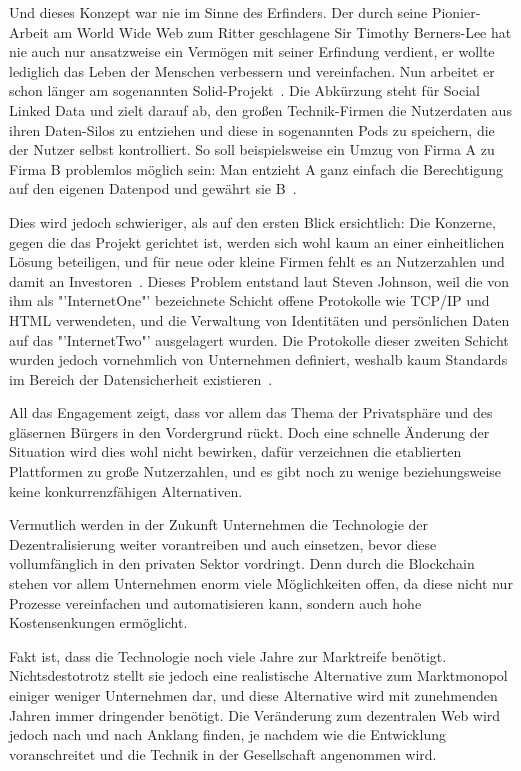 Und dieses Konzept war nie im Sinne des Erfinders. Der durch seine Pionier-Arbeit am World Wide Web zum Ritter geschlagene Sir Timothy Berners-Lee hat nie auch nur ansatzweise ein Vermögen mit seiner Erfindung verdient, er wollte lediglich das Leben der Menschen verbessern und vereinfachen. 
Nun arbeitet er schon länger am sogenannten Solid-Projekt~\cite{Clark.2018}. 
Die Abkürzung steht für Social Linked Data und zielt darauf ab, den großen Technik-Firmen die Nutzerdaten aus ihren Daten-Silos zu entziehen und diese in sogenannten Pods zu speichern, die der Nutzer selbst kontrolliert. 
So soll beispielsweise ein Umzug von Firma A zu Firma B problemlos möglich sein: Man entzieht A ganz einfach die Berechtigung auf den eigenen Datenpod und gewährt sie B~\cite{Park.2018}. 

\smallskip

Dies wird jedoch schwieriger, als auf den ersten Blick ersichtlich: Die Konzerne, gegen die das Projekt gerichtet ist, werden sich wohl kaum an einer einheitlichen Lösung beteiligen, und für neue oder kleine Firmen fehlt es an Nutzerzahlen und damit an Investoren~\cite{Park.2018}. Dieses Problem entstand laut Steven Johnson, weil die von ihm als "'InternetOne"' bezeichnete Schicht offene Protokolle wie TCP/IP und HTML verwendeten, und die Verwaltung von Identitäten und persönlichen Daten auf das "'InternetTwo"' ausgelagert wurden. Die Protokolle dieser zweiten Schicht wurden jedoch vornehmlich von Unternehmen definiert, weshalb kaum Standards im Bereich der Datensicherheit existieren~\cite{Bonset.2019}. 

\smallskip

All das Engagement zeigt, dass vor allem das Thema der Privatsphäre und des gläsernen Bürgers in den Vordergrund rückt. Doch eine schnelle Änderung der Situation wird dies wohl nicht bewirken, dafür verzeichnen die etablierten Plattformen zu große Nutzerzahlen, und es gibt noch zu wenige beziehungsweise keine konkurrenzfähigen Alternativen.

Vermutlich werden in der Zukunft Unternehmen die Technologie der Dezentralisierung weiter vorantreiben und auch einsetzen, bevor diese vollumfänglich in den privaten Sektor vordringt. Denn durch die Blockchain stehen vor allem Unternehmen enorm viele Möglichkeiten offen, da diese nicht nur Prozesse vereinfachen und automatisieren kann, sondern auch hohe Kostensenkungen ermöglicht.

Fakt ist, dass die Technologie noch viele Jahre zur Marktreife benötigt. Nichtsdestotrotz stellt sie jedoch eine realistische Alternative zum Marktmonopol einiger weniger Unternehmen dar, und diese Alternative wird mit zunehmenden Jahren immer dringender benötigt. Die Veränderung zum dezentralen Web wird jedoch nach und nach Anklang finden, je nachdem wie die Entwicklung voranschreitet und die Technik in der Gesellschaft angenommen wird.





